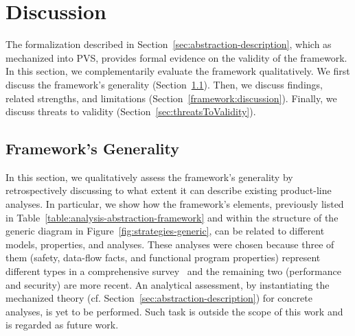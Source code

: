 \section{Discussion}
\label{sec:evaluation}
The formalization described in Section~\ref{sec:abstraction-description}, which as mechanized into PVS, provides formal evidence on the validity of the framework. In this section, we complementarily evaluate the framework qualitatively. 
We first discuss the framework's generality (Section~\ref{sec:frameworkInstances}). Then, we discuss findings, related strengths, and limitations (Section~\ref{framework:discussion}). Finally, we discuss threats to validity  (Section~\ref{sec:threatsToValidity}).

\subsection{Framework's Generality}
\label{sec:frameworkInstances}

In this section, we qualitatively assess the framework's generality by retrospectively discussing to what extent it can describe existing product-line analyses. In particular, we show how  the framework's elements, previously listed in Table~\ref{table:analysis-abstraction-framework} and within the structure of the generic diagram in Figure~\ref{fig:strategies-generic}, can be related to different models, properties, and analyses. 
These analyses were chosen because three of them (safety, data-flow facts, and functional program properties) represent different types in a comprehensive survey~\citep{Thum2014} and  the remaining two (performance and security) are more recent. 
An analytical assessment, by instantiating the mechanized theory (cf. Section~\ref{sec:abstraction-description}) for concrete analyses, is yet to be performed. Such task is outside the scope of this work and is regarded as future work. 



